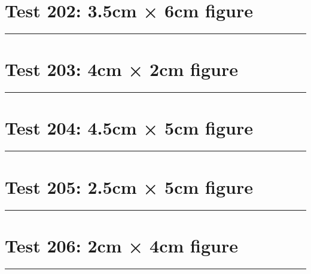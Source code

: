 \documentclass[a4paper,11pt]{article}
\begin{document}
\section*{Test 202: 3.5cm × 6cm figure}
\begin{swarmwrap}%
  \begin{minipage}[t]{3cm}
    \centering
    \rule{\linewidth}{6cm}
  \end{minipage}%
\end{swarmwrap}%
\swarmwrapnext
\lipsum[80]
\lipsum[81]
\lipsum[82]
\lipsum[83]
\lipsum[84]
\lipsum[85]
\section*{Test 203: 4cm × 2cm figure}
\begin{swarmwrap}%
  \begin{minipage}[t]{4cm}
    \centering
    \rule{\linewidth}{2cm}
  \end{minipage}%
\end{swarmwrap}%
\swarmwrapnext
\lipsum[55]
\lipsum[56]
\lipsum[57]
\section*{Test 204: 4.5cm × 5cm figure}
\begin{swarmwrap}%
  \begin{minipage}[t]{4cm}
    \centering
    \rule{\linewidth}{5cm}
  \end{minipage}%
\end{swarmwrap}%
\swarmwrapnext
\lipsum[22]
\lipsum[23]
\lipsum[24]
\lipsum[25]
\lipsum[26]
\section*{Test 205: 2.5cm × 5cm figure}
\begin{swarmwrap}%
  \begin{minipage}[t]{2cm}
    \centering
    \rule{\linewidth}{5cm}
  \end{minipage}%
\end{swarmwrap}%
\swarmwrapnext
\lipsum[143]
\lipsum[144]
\lipsum[145]
\lipsum[146]
\section*{Test 206: 2cm × 4cm figure}
\begin{swarmwrap}%
  \begin{minipage}[t]{2cm}
    \centering
    \rule{\linewidth}{4cm}
  \end{minipage}%
\end{swarmwrap}%
\swarmwrapnext
\lipsum[106]
\lipsum[107]
\lipsum[108]
\end{document}
